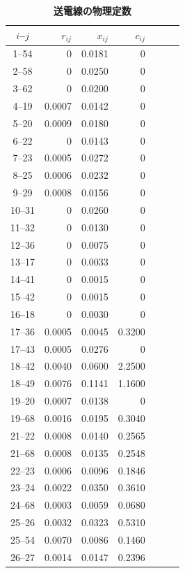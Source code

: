 \documentclass[tombow,dvipdfmx]{corona-a5-1.1}
\begin{document}
\begin{table}[h]
\medskip
\caption{\textbf{送電線の物理定数}} \label{table:ieee68lines}
 \centering
  {
  \begin{minipage}{0.49\linewidth}
    \centering
  \begin{tabular}{crrrrcc}
   \hline
$i$--$j$ & $r_{ij}$  &  $x_{ij}$ & $c_{ij}$ \\
   \hline \hline
1--54  & 0 & 0.0181 & 0 \\
2--58  & 0 & 0.0250 & 0 \\
3--62  & 0 & 0.0200 & 0 \\
4--19  & 0.0007 & 0.0142 & 0 \\
5--20  & 0.0009 & 0.0180 & 0 \\
6--22  & 0 & 0.0143 & 0 \\
7--23  & 0.0005 & 0.0272 & 0 \\
8--25  & 0.0006 & 0.0232 & 0 \\
9--29  & 0.0008 & 0.0156 & 0 \\
10--31  & 0 & 0.0260 & 0 \\
11--32  & 0 & 0.0130 & 0 \\
12--36  & 0 & 0.0075 & 0 \\
13--17  & 0 & 0.0033 & 0 \\
14--41  & 0 & 0.0015 & 0 \\
15--42  & 0 & 0.0015 & 0 \\
16--18  & 0 & 0.0030 & 0 \\
17--36  & 0.0005 & 0.0045 & 0.3200 \\
17--43  & 0.0005 & 0.0276 & 0 \\
18--42  & 0.0040 & 0.0600 & 2.2500 \\
18--49  & 0.0076 & 0.1141 & 1.1600 \\
19--20  & 0.0007 & 0.0138 & 0 \\
19--68  & 0.0016 & 0.0195 & 0.3040 \\
21--22  & 0.0008 & 0.0140 & 0.2565 \\
21--68  & 0.0008 & 0.0135 & 0.2548 \\
22--23  & 0.0006 & 0.0096 & 0.1846 \\
23--24  & 0.0022 & 0.0350 & 0.3610 \\
24--68  & 0.0003 & 0.0059 & 0.0680 \\
25--26  & 0.0032 & 0.0323 & 0.5310 \\
25--54  & 0.0070 & 0.0086 & 0.1460 \\
26--27  & 0.0014 & 0.0147 & 0.2396 \\

\end{tabular}
\end{minipage}}
\end{table}
\end{document}
